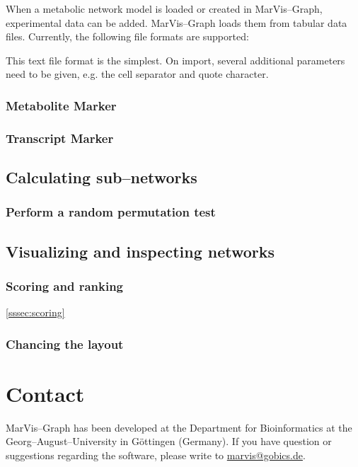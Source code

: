 \documentclass[titlepage,a4paper,twoside]{article}
\newcommand{\mg}{MarVis--Graph\xspace}
\begin{document}
When a metabolic network model is loaded or created in \mg, experimental
data can be added. \mg loads them from tabular data files. Currently, the
following file formats are supported:
\begin{description}
	\item[Comma--Separated--Values (*.csv)\footnote{\url{http://en.wikipedia.org/wiki/Comma-separated_values}}]
		This text file format is the simplest. On import, several additional
		parameters need to be given, e.g. the cell separator and quote
		character.
	\item 

\subsubsection{Metabolite Marker}

\subsubsection{Transcript Marker}

\subsection{Calculating sub--networks}\label{ssec:calculate}

\subsubsection{Perform a random permutation test}

\subsection{Visualizing and inspecting networks}

\subsubsection{Scoring and ranking} \ref{sssec:scoring}

\subsubsection{Chancing the layout}

\section{Contact}
\mg has been developed at the Department for Bioinformatics at the
Georg--August--University in G\"ottingen (Germany).
If you have question or suggestions regarding the software, please write to
\href{mailto:marvis@gobics.de}{marvis@gobics.de}.


\end{description}
\end{document}

